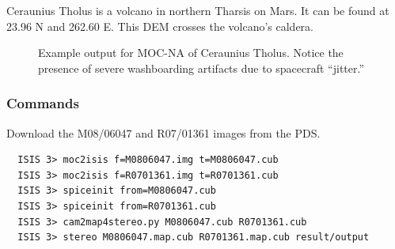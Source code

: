 Ceraunius Tholus is a volcano in northern Tharsis on Mars. It can
be found at 23.96 N and 262.60 E. This \ac{DEM} crosses the volcano's
caldera.

\begin{figure}[h]
\centering
  \hfil
\caption{Example output for MOC-NA of Ceraunius Tholus. Notice the presence of severe washboarding artifacts due to spacecraft ``jitter.''}
\label{fig:mocna_ceraunius_example}
\end{figure}

\subsubsection*{Commands}

Download the M08/06047 and R07/01361 images from the \ac{PDS}.

\begin{verbatim}
  ISIS 3> moc2isis f=M0806047.img t=M0806047.cub
  ISIS 3> moc2isis f=R0701361.img t=R0701361.cub
  ISIS 3> spiceinit from=M0806047.cub
  ISIS 3> spiceinit from=R0701361.cub
  ISIS 3> cam2map4stereo.py M0806047.cub R0701361.cub
  ISIS 3> stereo M0806047.map.cub R0701361.map.cub result/output
\end{verbatim}

